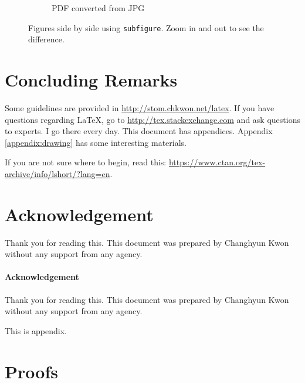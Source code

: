 \documentclass[letterpaper, 11pt]{article}
\begin{document}
\begin{figure}
\begin{subfigure}[b]{0.4\textwidth}
\caption{PDF converted from JPG}
\label{fig:map-jpg}
\end{subfigure}
\caption{Figures side by side using \texttt{subfigure}. Zoom in and out to see the difference.}
\label{fig:side-by-side}
\end{figure}











\section{Concluding Remarks}

Some guidelines are provided in \url{http://stom.chkwon.net/latex}.
If you have questions regarding \LaTeX, go to \url{http://tex.stackexchange.com} and ask questions to experts.
I go there every day.
This document has appendices.
Appendix \ref{appendix:drawing} has some interesting materials.

If you are not sure where to begin, read this: \url{https://www.ctan.org/tex-archive/info/lshort/?lang=en}.


\section*{Acknowledgement}
Thank you for reading this.
This document was prepared by Changhyun Kwon without any support from any agency.


\paragraph{Acknowledgement}
Thank you for reading this.
This document was prepared by Changhyun Kwon without any support from any agency.











\newpage
\renewcommand{\appendixpagename}{Appendix}

\appendix
\appendixpage

This is appendix.

\section{Proofs} \label{appendix:proofs}
\end{document}
